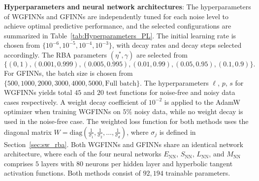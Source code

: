 \documentclass[final]{siamltex}
\begin{document}
\begin{appendices}
{\bf Hyperparameters and neural network architectures}:
The hyperparameters of WGFINNs and GFINNs are independently tuned for each 
noise level to achieve optimal predictive performance, and the selected 
configurations are summarized in Table~\ref{tab:Hyperparameters_PL}.
The initial learning rate is chosen from $\{10^{-6}, 10^{-5}, 10^{-4}, 10^{-3}\}$, 
with decay rates and decay steps selected accordingly.
The RBA parameters $(\eta^*, \gamma)$ are selected from
\begin{equation*}
\{ (0 , 1), (0.001 , 0.999), (0.005 , 0.995), (0.01 , 0.99), (0.05 , 0.95), (0.1, 0.9)\}.
\end{equation*}
For GFINNs, the batch size is chosen from 
$\{500, 1000, 2000, 3000, 4000, 5000, \text{Full batch}\}$.
The hyperparameters $\ell$, $p$, $s$ for WGFINNs yields total $45$ and $20$ test functions for noise-free and noisy data cases respectively.
A weight decay coefficient of $10^{-2}$ is applied to the AdamW optimizer when 
training WGFINNs on $5\%$ noisy data, while no weight decay is used in the noise-free case.
The weighted loss function for both methods uses the diagonal matrix
$W = \mathrm{diag}\left(\frac{1}{\sigma_1}, \frac{1}{\sigma_2}, \ldots, \frac{1}{\sigma_d}\right)$,
where $\sigma_j$ is defined in Section~\ref{sec:sw_rba}.
Both WGFINNs and GFINNs share an identical network architecture, where each of 
the four neural networks $E_{\mathrm{NN}}$, $S_{\mathrm{NN}}$, $L_{\mathrm{NN}}$, 
and $M_{\mathrm{NN}}$ comprises $5$ layers with $80$ neurons per hidden 
layer and hyperbolic tangent activation functions. Both methods consist of $92{,}194$ trainable parameters.



\end{appendices}
\end{document}

